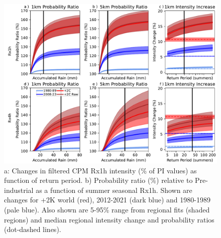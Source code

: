 \documentclass[11pt,a4paper]{article}
\begin{document}
\begin{figure}
	\centering
	\includegraphics[width=1\linewidth]{intens_prob_ratios}
	\caption{a: Changes in filtered CPM Rx1h intensity (\% of PI values) as function of return period. b) Probability ratio (\%) relative to Pre-industrial as a function of summer seasonal Rx1h. Shown are changes for +2K world (red), 2012-2021 (dark blue) and 1980-1989 (pale blue). Also shown are 5-95\% range from regional fits (shaded regions) and median regional intensity change and probability ratios (dot-dashed lines).}
	\label{fig:int_pr}
\end{figure}
\end{document}
